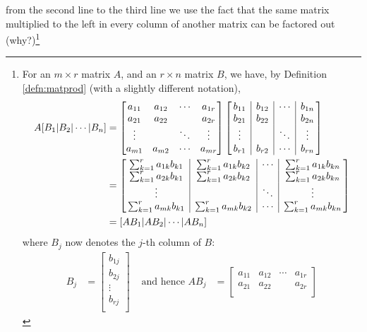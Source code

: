 from the second line to the third line we use the fact that the same matrix multiplied to the left in every column of another matrix can be factored out (why?)\footnote{For an $m \times r$ matrix $A$, and an $r \times n$ matrix $B$, we have, by Definition \ref{defn:matprod} (with a slightly different notation),
\begin{align*}
A[B_1|B_2|\cdots|B_n] &= \begin{bmatrix}
a_{11} & a_{12} & \cdots & a_{1r} \\
a_{21} & a_{22} & & a_{2r} \\
\vdots & & \ddots & \vdots \\
a_{m1} & a_{m2} & \cdots & a_{mr} \\
\end{bmatrix}
\left[\begin{array}{@{\,}c|c|c|c@{\,}}
b_{11} & b_{12} & \cdots & b_{1n} \\
b_{21} & b_{22} & & b_{2n} \\
\vdots & & \ddots & \vdots \\
b_{r1} & b_{r2} & \cdots & b_{rn} \\    
\end{array}\right] \\
&=
\left[\begin{array}{@{\,}c|c|c|c@{\,}}
\sum_{k=1}^r a_{1k}b_{k1} & \sum_{k=1}^r a_{1k}b_{k2} & \cdots & \sum_{k=1}^r a_{1k}b_{kn} \\
\sum_{k=1}^r a_{2k}b_{k1} & \sum_{k=1}^r a_{2k}b_{k2} & & \sum_{k=1}^r a_{2k}b_{kn} \\
\vdots & & \ddots & \vdots \\
\sum_{k=1}^r a_{mk}b_{k1} & \sum_{k=1}^r a_{mk}b_{k2} & \cdots & \sum_{k=1}^r a_{mk}b_{kn} \\
\end{array}\right] \\
&=
[AB_1|AB_2|\cdots|AB_n]
\end{align*} where $B_j$ now denotes the $j$-th column of $B$:
\begin{align*}
B_j &= \begin{bmatrix}
b_{1j} \\
b_{2j} \\
\vdots \\
b_{rj} \\
\end{bmatrix}
&
\text{ and hence }
AB_j &= \begin{bmatrix}
a_{11} & a_{12} & \cdots & a_{1r} \\
a_{21} & a_{22} & & a_{2r} \\

\end{bmatrix}
\end{align*}}
